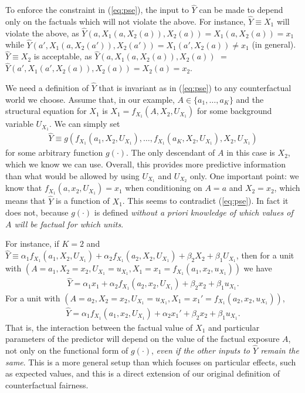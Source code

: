 \documentclass{article}
\begin{document}
To enforce the constraint in (\ref{eq:pse}), the input to $\hat Y$ can be made
to depend only on the factuals which will not violate the above. For instance,
$\hat Y \equiv X_1$ will violate the above, as $\hat Y(a, X_1(a, X_2(a)), X_2(a)) =
X_1(a, X_2(a)) = x_1$ while $\hat Y(a', X_1(a, X_2(a')), X_2(a')) = X_1(a', X_2(a)) \neq x_1$
(in general).
$\hat Y \equiv X_2$ is acceptable, as  $\hat Y(a, X_1(a, X_2(a)), X_2(a))$ $=$
$\hat Y(a', X_1(a', X_2(a)), X_2(a)) = X_2(a) = x_2$.

We need a definition of $\hat Y$ that is invariant as in
(\ref{eq:pse}) to any counterfactual world we choose. Assume that, in
our example, $A \in \{a_1, \dots, a_K\}$ and the structural equation
for $X_1$ is $X_1 = f_{X_1}(A, X_2, U_{X_1})$ for some background
variable $U_{X_1}$. We can simply set
\begin{align}
\hat Y \equiv g(f_{X_1}(a_1,
X_2, U_{X_1}), \dots, f_{X_1}(a_K, X_2, U_{X_1}), X_2, U_{X_1}) \nonumber
\end{align}
for some arbitrary function $g(\cdot)$. The only descendant of $A$ in this
case is $X_2$, which we know we can use. Overall, this provides more
predictive information than what would be allowed by using $U_{X_1}$
and $U_{X_2}$ only. One important point: we know that $f_{X_1}(a, x_2,
U_{X_1}) = x_1$ when conditioning on $A = a$ and $X_2 = x_2$, which
means that $\hat Y$ is a function of $X_1$. This seems to contradict
(\ref{eq:pse}). In fact it does not, because $g(\cdot)$ is defined
\emph{without a priori knowledge of which values of $A$ will be
  factual for which units}. 
  
For instance, if $K = 2$ and $\hat Y
\equiv \alpha_{1} f_{X_1}(a_1, X_2, U_{X_1}) + \alpha_{2} f_{X_1}(a_2, X_2,
U_{X_1}) + \beta_2 X_2 + \beta_1 U_{X_1}$, then for a unit with $(A =
a_1, X_2 = x_2, U_{X_1} = u_{X_1}, X_1 = x_1 = f_{X_1}(a_1, x_2,
u_{X_1}))$ we have 
\begin{align*}
\hat Y = \alpha_{1}x_1 + \alpha_{2}f_{X_1}(a_2, x_2,
U_{X_1}) + \beta_2 x_2 + \beta_1 u_{X_1}.
\end{align*}
For a unit with $(A = a_2,
X_2 = x_2, U_{X_1} = u_{X_1}, X_1 = x_1' = f_{X_1}(a_2, x_2,
u_{X_1}))$,
\begin{align*}
\hat Y = \alpha_{1}f_{X_1}(a_1, x_2, U_{X_1}) +
\alpha_{2}x_1' + \beta_2 x_2 + \beta_1 u_{X_1}.
\end{align*}
That is, the
interaction between the factual value of $X_1$ and particular
parameters of the predictor will depend on the value of the factual
exposure $A$, not only on the functional form of $g(\cdot)$, \emph{even if
the other inputs to $\hat Y$ remain the same}. This is a
more general setup than \cite{silvia:18} which focuses on particular
effects, such as expected values, and this is a direct extension of our
original definition of counterfactual fairness.
\end{document}
